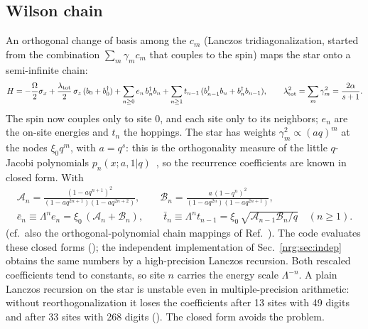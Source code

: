 \subsection{Wilson chain}
An orthogonal change of basis among the $c_m$ (Lanczos tridiagonalization, started from the combination $\sum_m\gamma_mc_m$ that
couples to the spin) maps the star onto a semi-infinite chain:
\begin{equation}
H=-\frac{\Omega}{2}\sigma_x+\frac{\lambda_{\rm tot}}{2}\,\sigma_z\,(b_0+b_0^\dagger)+\sum_{n\ge0}e_n\, b_n^\dagger b_n
+\sum_{n\ge1}t_{n-1}\,(b_{n-1}^\dagger b_n+b_n^\dagger b_{n-1}),\qquad \lambda_{\rm tot}^2=\sum_m\gamma_m^2=\frac{2\alpha}{s+1}.
\label{nrg:eq:chain}
\end{equation}
The spin now couples only to site 0, and each site only to its neighbors; $e_n$ are the on-site energies and $t_n$ the hoppings. The
star has weights $\gamma_m^2\propto(aq)^m$ at the nodes $\xi_0q^m$, with $a=q^s$: this is the orthogonality measure of the little
$q$-Jacobi polynomials $p_n(x;a,1|q)$~\cite{nrg:KLS10}, so the recurrence coefficients are known in closed form. With
\begin{gather}
\mathcal A_n=\frac{(1-aq^{n+1})^2}{(1-aq^{2n+1})(1-aq^{2n+2})},\qquad
\mathcal B_n=\frac{a\,(1-q^n)^2}{(1-aq^{2n})(1-aq^{2n+1})},\nonumber\\
\bar e_n\equiv\Lambda^{n}e_n=\xi_0\,(\mathcal A_n+\mathcal B_n),\qquad
\bar t_n\equiv\Lambda^{n}t_{n-1}=\xi_0\,\sqrt{\mathcal A_{n-1}\mathcal B_n/q}\quad(n\ge1).\label{nrg:eq:coeff}
\end{gather}
(cf.\ also the orthogonal-polynomial chain mappings of Ref.~\cite{nrg:Chin2010}). The code evaluates these closed forms
(); the independent implementation of Sec.~\ref{nrg:sec:indep} obtains the same numbers by a
high-precision Lanczos recursion. Both rescaled coefficients tend to constants, so site $n$ carries the energy scale $\Lambda^{-n}$.
A plain Lanczos recursion on the star is unstable even in multiple-precision arithmetic: without reorthogonalization it loses the
coefficients after 13 sites with 49 digits and after 33 sites with 268 digits (). The closed form
avoids the problem.

